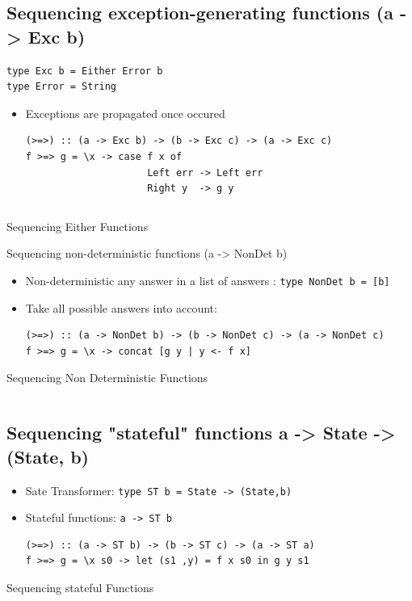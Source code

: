 \documentclass{article}
\newcommand{\Haskell}[1]{\texttt{#1}}
\begin{document}
\subsection{Sequencing exception-generating functions (a -> Exc b)}
\begin{verbatim}
type Exc b = Either Error b
type Error = String
\end{verbatim}
\begin{itemize}
\item Exceptions are propagated once occured
\begin{verbatim}
(>=>) :: (a -> Exc b) -> (b -> Exc c) -> (a -> Exc c)
f >=> g = \x -> case f x of
                     Left err -> Left err
                     Right y  -> g y
\end{verbatim}
\end{itemize}
\begin{listing}
\inputminted{Haskell}{sequence-Either.hs}
\caption{Sequencing Either Functions}
\end{listing}
Sequencing non-deterministic functions (a -> NonDet b)
\begin{itemize}
\item Non-deterministic any answer in a list of answers : \Haskell{type NonDet b = [b]}
\item Take all possible answers into account:
\begin{verbatim}
(>=>) :: (a -> NonDet b) -> (b -> NonDet c) -> (a -> NonDet c)
f >=> g = \x -> concat [g y | y <- f x]
\end{verbatim}
\end{itemize}
\begin{listing}
\caption{Sequencing Non Deterministic Functions}
\inputminted[]{Haskell}{sequence-NonDet.hs}
\end{listing}
\clearpage
\subsection{Sequencing "stateful" functions a -> State -> (State, b)}
\begin{itemize}
\item Sate Transformer: \Haskell{type ST b = State -> (State,b)}
\item Stateful functions: \Haskell{a -> ST b}
\begin{verbatim}
(>=>) :: (a -> ST b) -> (b -> ST c) -> (a -> ST a)
f >=> g = \x s0 -> let (s1 ,y) = f x s0 in g y s1
\end{verbatim}
\end{itemize}
\begin{listing}
\caption{Sequencing stateful Functions}
\inputminted[]{Haskell}{sequence-ST.hs}
\end{listing}
\clearpage
\end{document}
